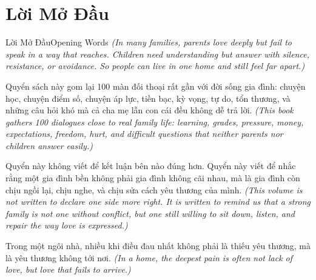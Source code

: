 \chapter*{Lời Mở Đầu}

\begin{truyen}{Lời Mở Đầu}{Opening Words}
\textit{(In many families, parents love deeply but fail to speak in a way that reaches. Children need understanding but answer with silence, resistance, or avoidance. So people can live in one home and still feel far apart.)}

Quyển sách này gom lại 100 màn đối thoại rất gần với đời sống gia đình: chuyện học, chuyện điểm số, chuyện áp lực, tiền bạc, kỳ vọng, tự do, tổn thương, và những câu hỏi khó mà cả cha mẹ lẫn con cái đều không dễ trả lời.
\textit{(This book gathers 100 dialogues close to real family life: learning, grades, pressure, money, expectations, freedom, hurt, and difficult questions that neither parents nor children answer easily.)}

Quyển này không viết để kết luận bên nào đúng hơn. Quyển này viết để nhắc rằng một gia đình bền không phải gia đình không cãi nhau, mà là gia đình còn chịu ngồi lại, chịu nghe, và chịu sửa cách yêu thương của mình.
\textit{(This volume is not written to declare one side more right. It is written to remind us that a strong family is not one without conflict, but one still willing to sit down, listen, and repair the way love is expressed.)}
\end{truyen}

\begin{baihoc}
Trong một ngôi nhà, nhiều khi điều đau nhất không phải là thiếu yêu thương, mà là yêu thương không tới nơi.
\textit{(In a home, the deepest pain is often not lack of love, but love that fails to arrive.)}
\end{baihoc}
\ngancach